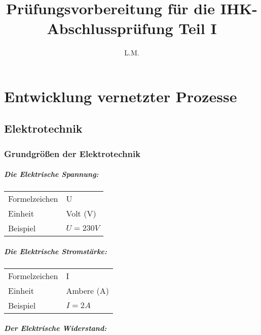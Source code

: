 \documentclass[a4paper, 12pt]{report}
\title{Prüfungsvorbereitung für die IHK-Abschlussprüfung Teil I}
\author{L.M.}
\begin{document}
\maketitle

\tableofcontents

\newpage
\chapter{Entwicklung vernetzter Prozesse}
\section{Elektrotechnik}
\subsection{Grundgrößen der Elektrotechnik}

\paragraph{Die Elektrische Spannung:}

\begin{center}
	\begin{tabular}{ ll }
		Formelzeichen & U            \\ 
		Einheit       & Volt (V)     \\
		Beispiel      & $U = 230V$ \\ 
	\end{tabular}
\end{center}

\paragraph{Die Elektrische Stromstärke:}

\begin{center}
	\begin{tabular}{ ll }
		Formelzeichen & I            \\ 
		Einheit       & Ambere (A)   \\
		Beispiel      & $I = 2A$    \\
	\end{tabular}
\end{center}

\paragraph{Der Elektrische Widerstand:}
\end{document}
